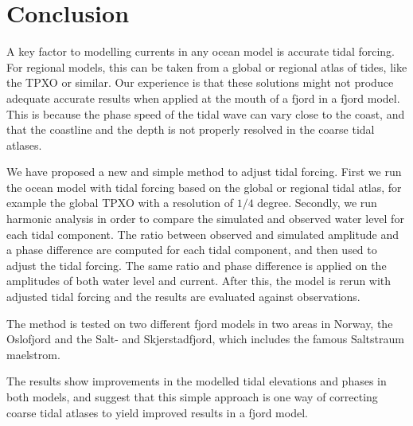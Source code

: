 \section{Conclusion}

A key factor to modelling currents in any ocean model is accurate tidal forcing. For regional models, this can be taken from a global or regional atlas of tides, like the TPXO or similar. Our experience is that these solutions might not produce adequate accurate results when applied at the mouth of a fjord in a fjord model. This is because the phase speed of the tidal wave can vary close to the coast, and that the coastline and the depth is not properly resolved in the coarse tidal atlases.

We have proposed a new and simple method to adjust tidal forcing. First we run the ocean model with tidal forcing based on the global or regional tidal atlas, for example the global TPXO with a resolution of $1/4$ degree. Secondly, we run harmonic analysis in order to compare the simulated and observed water level for each tidal component. The ratio between observed and simulated amplitude and a phase difference are computed for each tidal component, and then used to adjust the tidal forcing. The same ratio and phase difference is applied on the amplitudes of both water level and current. After this, the model is rerun with adjusted tidal forcing and the results are evaluated against observations.

The method is tested on two different fjord models in two areas in Norway, the Oslofjord and the Salt- and Skjerstadfjord, which includes the famous Saltstraum maelstrom.
 
The results show improvements in the modelled tidal elevations and phases in both models, and suggest that this simple approach is one way of correcting coarse tidal atlases to yield improved results in a fjord model.
